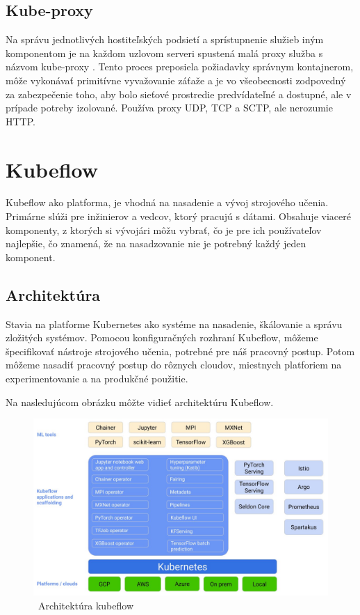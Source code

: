 \subsection*{Kube-proxy}
Na správu jednotlivých hostiteľských podsietí a sprístupnenie služieb iným komponentom je na každom uzlovom serveri spustená malá proxy služba s názvom kube-proxy . Tento proces preposiela požiadavky správnym kontajnerom, môže vykonávať primitívne vyvažovanie záťaže a je vo všeobecnosti zodpovedný za zabezpečenie toho, aby bolo sieťové prostredie predvídateľné a dostupné, ale v prípade potreby izolované. Používa proxy UDP, TCP a SCTP, ale nerozumie HTTP.

\section{Kubeflow}
Kubeflow ako platforma, je vhodná na nasadenie a vývoj strojového učenia. Primárne slúži pre inžinierov a vedcov, ktorý pracujú s dátami. Obsahuje viaceré komponenty, z ktorých si vývojári môžu vybrať, čo je pre ich používateľov najlepšie, čo znamená, že na nasadzovanie nie je potrebný každý jeden komponent.\cite{web}
\subsection{Architektúra}

Stavia na platforme Kubernetes ako systéme na nasadenie, škálovanie a správu zložitých systémov. Pomocou konfiguračných rozhraní Kubeflow, môžeme špecifikovať nástroje strojového učenia, potrebné pre náš pracovný postup. Potom môžeme nasadiť pracovný postup do rôznych cloudov, miestnych platforiem na experimentovanie a na produkčné použitie.\cite{web}

Na nasledujúcom obrázku môžte vidieť architektúru Kubeflow.

\clearpage
\begin{figure}[!ht]
    \includegraphics[width=.9\textwidth]{figures/kubeflowaarch}
    \caption{\ Architektúra kubeflow \label{o:latex_friendly_zone}}
\end{figure}

